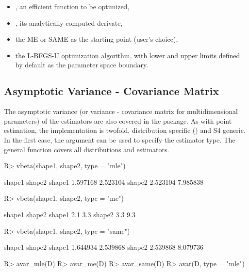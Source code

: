 \documentclass[nojss]{jss}
\newcommand{\fct}[1]{\code{#1()}}
\begin{document}
\begin{itemize}
  \item \fct{lloptim}, an efficient function to be optimized,
  \item \fct{dlloptim}, its analytically-computed derivate,
  \item the ME or SAME as the starting point (user's choice),
  \item the L-BFGS-U optimization algorithm, with lower and upper limits defined by default as the parameter space boundary.
\end{itemize}

\subsection[Asymptotic Variance - Covariance Matrix]{Asymptotic Variance - Covariance Matrix} \label{s:avar}

The asymptotic variance (or variance - covariance matrix for multidimensional parameters) of the estimators are also covered in the package. As with point estimation, the implementation is twofold, distribution specific (\fct{vbeta}) and S4 generic. In the first case, the  argument can be used to specify the estimator type. The general function \fct{avar} covers all distributions and estimators.

\begin{Schunk}
\begin{Sinput}
R> vbeta(shape1, shape2, type = "mle")
\end{Sinput}
\begin{Soutput}
         shape1   shape2
shape1 1.597168 2.523104
shape2 2.523104 7.985838
\end{Soutput}
\begin{Sinput}
R> vbeta(shape1, shape2, type = "me")
\end{Sinput}
\begin{Soutput}
       shape1 shape2
shape1    2.1    3.3
shape2    3.3    9.3
\end{Soutput}
\begin{Sinput}
R> vbeta(shape1, shape2, type = "same")
\end{Sinput}
\begin{Soutput}
         shape1   shape2
shape1 1.644934 2.539868
shape2 2.539868 8.079736
\end{Soutput}
\end{Schunk}

\begin{CodeChunk}
\begin{CodeInput}
R> avar_mle(D)
R> avar_me(D)
R> avar_same(D)
R> avar(D, type = "mle")
\end{CodeInput}
\end{CodeChunk}
\end{document}
